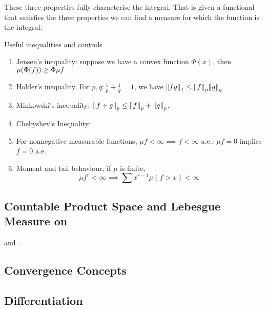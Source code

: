 \begin{remark}
    These three properties fully characterise the integral. That is given a functional that satisfies the three properties we can find a measure for which the function is the integral. 
\end{remark}

\begin{thm}
    Useful inequalities and controls
    \begin{enumerate}
        \item Jensen's inequality: suppose we have a convex function \(\Phi(x)\), then \(\mu\pqty{\Phi(f)} \geq \Phi \mu f\)
        \item Holder's inequality. For \(p,q: \frac{1}{p} + \frac{1}{q} = 1\), we have \(\norm{fg}_{1} \leq \norm{f}_{p} \norm{g}_{q}\)
        \item Minkowski's inequality: \(\norm{f + g}_{p} \leq \norm{f}_{p} + \norm{g}_{p}\).
        \item Chebyshev's Inequality: 
        \item For nonnegative measurable functions, \(\mu f < \infty  \implies f < \infty\) a.e., \(\mu f = 0\) implies \(f = 0\) a.e. 
        \item Moment and tail behaviour, if \(\mu\) is finite, 
        \begin{equation*}
            \mu f^{r} < \infty \implies \sum x^{r - 1} \mu(f> x) < \infty
        \end{equation*}

    \end{enumerate}    
\end{thm}

\subsection{Countable Product Space and Lebesgue Measure on }

 and . 
\begin{thm}

\end{thm}

\subsection{Convergence Concepts}

\begin{thm}
    
\end{thm}

\begin{thm}
    
\end{thm}

\subsection{Differentiation}
